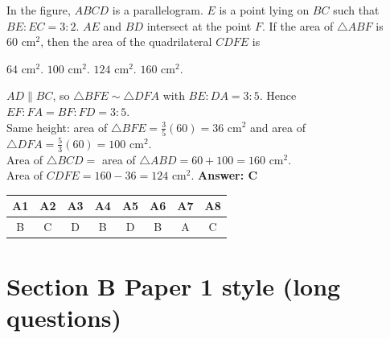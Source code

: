 \documentclass[11pt,addpoints]{exam}
\newcommand{\cm}[1]{\text{ cm}^{#1}}
\begin{document}
\begin{questions}
\begin{minipage}[t]{0.6\linewidth}
In the figure, $ABCD$ is a parallelogram. $E$ is a point lying on $BC$ such that $BE : EC = 3 : 2$. $AE$ and $BD$ intersect at the point $F$. If the area of $\triangle ABF$ is $60\cm2$, then the area of the quadrilateral $CDFE$ is
\begin{oneparchoices}
  \choice $64\cm2$. \choice $100\cm2$. \CorrectChoice $124\cm2$. \choice $160\cm2$.
\end{oneparchoices}
\end{minipage}\hfill
\begin{minipage}[t]{0.36\linewidth}
\vspace{-4pt}\centering
{}
\end{minipage}
\begin{solution}
$AD \parallel BC$, so $\triangle BFE \sim \triangle DFA$ with $BE : DA = 3 : 5$. Hence $EF : FA = BF : FD = 3 : 5$.\\
Same height: area of $\triangle BFE = \frac35(60) = 36\cm2$ and area of $\triangle DFA = \frac53(60) = 100\cm2$.\\
Area of $\triangle BCD = $ area of $\triangle ABD = 60 + 100 = 160\cm2$.\\
Area of $CDFE = 160 - 36 = 124\cm2$. \quad \textbf{Answer: C} 
\end{solution}
\end{questions}

\ifdefined\ANSWERS
\begin{center}
\begin{tabular}{*{8}{c}}
\toprule
A1 & A2 & A3 & A4 & A5 & A6 & A7 & A8\\
\midrule
B & C & D & B & D & B & A & C\\
\bottomrule
\end{tabular}
\end{center}
\fi

\newpage
\section*{Section B \quad Paper 1 style (long questions)}
\end{document}
